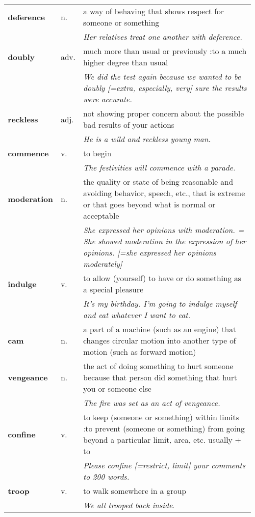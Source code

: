 \documentclass[a4paper]{article}
\begin{document}
\begin{longtable}{llp{11cm}}
\textbf{deference} & n. &  a way of behaving that shows respect for someone or something \\
 & & \textit{Her relatives treat one another with deference.}\\[0.08cm]
\textbf{doubly} & adv. &  much more than usual or previously :to a much higher degree than usual \\
 & & \textit{We did the test again because we wanted to be doubly [=extra, especially, very] sure the results were accurate.}\\[0.08cm]
\textbf{reckless} & adj. &  not showing proper concern about the possible bad results of your actions \\
 & & \textit{He is a wild and reckless young man.}\\[0.08cm]
\textbf{commence} & v. &  to begin \\
 & & \textit{The festivities will commence with a parade.}\\[0.08cm]
\textbf{moderation} & n. &  the quality or state of being reasonable and avoiding behavior, speech, etc., that is extreme or that goes beyond what is normal or acceptable \\
 & & \textit{She expressed her opinions with moderation. = She showed moderation in the expression of her opinions. [=she expressed her opinions moderately]}\\[0.08cm]
\textbf{indulge} & v. &  to allow (yourself) to have or do something as a special pleasure \\
 & & \textit{It's my birthday. I'm going to indulge myself and eat whatever I want to eat.}\\[0.08cm]
\textbf{cam} & n. &  a part of a machine (such as an engine) that changes circular motion into another type of motion (such as forward motion)\\[0.08cm]
\textbf{vengeance} & n. &  the act of doing something to hurt someone because that person did something that hurt you or someone else \\
 & & \textit{The fire was set as an act of vengeance.}\\[0.08cm]
\textbf{confine} & v. &  to keep (someone or something) within limits :to prevent (someone or something) from going beyond a particular limit, area, etc. usually + to \\
 & & \textit{Please confine [=restrict, limit] your comments to 200 words.}\\[0.08cm]
\textbf{troop} & v. &  to walk somewhere in a group \\
 & & \textit{We all trooped back inside.}\\[0.08cm]

\end{longtable}
\end{document}
